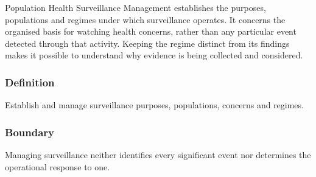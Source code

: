 Population Health Surveillance Management establishes the purposes, populations and regimes under which surveillance operates. It concerns the organised basis for watching health concerns, rather than any particular event detected through that activity. Keeping the regime distinct from its findings makes it possible to understand why evidence is being collected and considered.

\subsubsection*{Definition}

Establish and manage surveillance purposes, populations, concerns and regimes.

\subsubsection*{Boundary}

Managing surveillance neither identifies every significant event nor determines the operational response to one.

